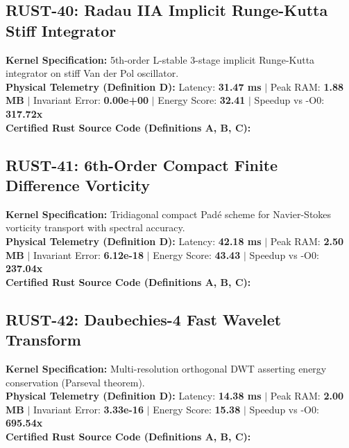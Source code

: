 \vspace{1em}
\subsection{RUST-40: Radau IIA Implicit Runge-Kutta Stiff Integrator}
\textbf{Kernel Specification:} 5th-order L-stable 3-stage implicit Runge-Kutta integrator on stiff Van der Pol oscillator.\\
\textbf{Physical Telemetry (Definition D):} Latency: \textbf{31.47 ms} $|$ Peak RAM: \textbf{1.88 MB} $|$ Invariant Error: \textbf{0.00e+00} $|$ Energy Score: \textbf{32.41} $|$ Speedup vs -O0: \textbf{317.72x}\\

\textbf{Certified Rust Source Code (Definitions A, B, C):}


\vspace{1em}
\subsection{RUST-41: 6th-Order Compact Finite Difference Vorticity}
\textbf{Kernel Specification:} Tridiagonal compact Padé scheme for Navier-Stokes vorticity transport with spectral accuracy.\\
\textbf{Physical Telemetry (Definition D):} Latency: \textbf{42.18 ms} $|$ Peak RAM: \textbf{2.50 MB} $|$ Invariant Error: \textbf{6.12e-18} $|$ Energy Score: \textbf{43.43} $|$ Speedup vs -O0: \textbf{237.04x}\\

\textbf{Certified Rust Source Code (Definitions A, B, C):}


\vspace{1em}
\subsection{RUST-42: Daubechies-4 Fast Wavelet Transform}
\textbf{Kernel Specification:} Multi-resolution orthogonal DWT asserting energy conservation (Parseval theorem).\\
\textbf{Physical Telemetry (Definition D):} Latency: \textbf{14.38 ms} $|$ Peak RAM: \textbf{2.00 MB} $|$ Invariant Error: \textbf{3.33e-16} $|$ Energy Score: \textbf{15.38} $|$ Speedup vs -O0: \textbf{695.54x}\\

\textbf{Certified Rust Source Code (Definitions A, B, C):}


